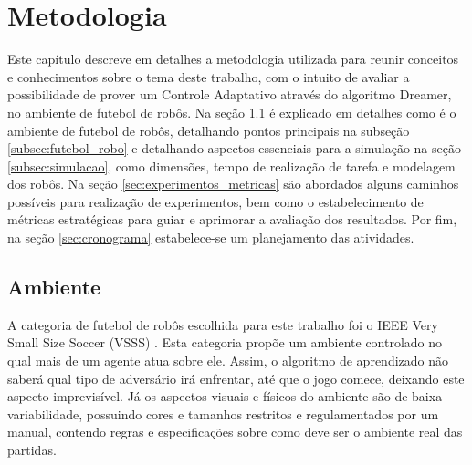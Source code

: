 \chapter{Metodologia}
\label{cap:metodologia}

Este capítulo descreve em detalhes a metodologia utilizada para reunir conceitos e conhecimentos sobre o tema deste trabalho, com o intuito de avaliar a possibilidade de prover um Controle Adaptativo através do algoritmo Dreamer, no ambiente de futebol de robôs. Na seção \ref{sec:ambiente} é explicado em detalhes como é o ambiente de futebol de robôs, detalhando pontos principais na subseção \ref{subsec:futebol_robo} e detalhando aspectos essenciais para a simulação na seção \ref{subsec:simulacao}, como dimensões, tempo de realização de tarefa e modelagem dos robôs. Na seção \ref{sec:experimentos_metricas} são abordados alguns caminhos possíveis para realização de experimentos, bem como o estabelecimento de métricas estratégicas para guiar e aprimorar a avaliação dos resultados. Por fim, na seção \ref{sec:cronograma} estabelece-se um planejamento das atividades.


\section{Ambiente}
\label{sec:ambiente}

A categoria de futebol de robôs escolhida para este trabalho foi o IEEE Very Small Size Soccer (VSSS) \cite{regras_vss2023}. Esta categoria propõe um ambiente controlado no qual mais de um agente atua sobre ele. Assim, o algoritmo de aprendizado não saberá qual tipo de adversário irá enfrentar, até que o jogo comece, deixando este aspecto imprevisível. Já os aspectos visuais e físicos do ambiente são de baixa variabilidade, possuindo cores e tamanhos restritos e regulamentados por um manual, contendo regras e especificações sobre como deve ser o ambiente real das partidas.

